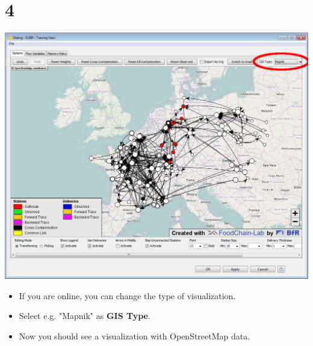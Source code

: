 \documentclass{beamer}
\begin{document}
\section{4}
\begin{frame}
	\begin{center}
  		\includegraphics[height=0.6\textheight]{4.png}
	\end{center}
	\begin{itemize}
		\item If you are online, you can change the type of visualization.
		\item Select e.g. "Mapnik" as \textbf{GIS Type}.
		\item Now you should see a visualization with OpenStreetMap data.
	\end{itemize}
\end{frame}
\end{document}
